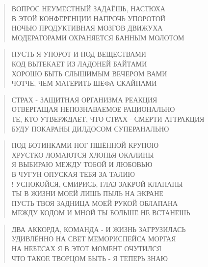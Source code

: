 \poemtitle{***}
\begin{verse}
ВОПРОС НЕУМЕСТНЫЙ ЗАДАЁШЬ, НАСТЮХА\\
В ЭТОЙ КОНФЕРЕНЦИИ НАПРОЧЬ УПОРОТОЙ\\
НОЧЬЮ ПРОДУКТИВНАЯ МОЗГОВ ДВИЖУХА\\
МОДЕРАТОРАМИ ОХРАНЯЕТСЯ БАННЫМ МОЛОТОМ
\end{verse}

\poemtitle{***}
\begin{verse}
ПУСТЬ Я УПОРОТ И ПОД ВЕЩЕСТВАМИ\\
КОД ВЫТЕКАЕТ ИЗ ЛАДОНЕЙ БАЙТАМИ\\
ХОРОШО БЫТЬ СЛЫШИМЫМ ВЕЧЕРОМ ВАМИ\\
ЧОТЧЕ, ЧЕМ МАТЕРИТЬ ШЕФА СКАЙПАМИ
\end{verse}

\poemtitle{***}
\begin{verse}
СТРАХ - ЗАЩИТНАЯ ОРГАНИЗМА РЕАКЦИЯ\\
ОТВЕРГАЩАЯ НЕПОЗНАВАЕМОЕ РАЦИОНАЛЬНО\\
ТЕ, КТО УТВЕРЖДАЕТ, ЧТО СТРАХ - СМЕРТИ АТТРАКЦИЯ\\
БУДУ ПОКАРАНЫ ДИЛДОСОМ СУПЕРАНАЛЬНО
\end{verse}

\poemtitle{***}
\begin{verse}
ПОД БОТИНКАМИ НОГ ПШЁННОЙ КРУПОЮ\\
ХРУСТКО ЛОМАЮТСЯ ХЛОПЬЯ ОКАЛИНЫ\\
Я ВЫБИРАЮ МЕЖДУ ТОБОЙ И ЛЮБОВЬЮ\\
В ЧУГУН ОПУСКАЯ ТЕБЯ ЗА ТАЛИЮ\\!
УСПОКОЙСЯ, СМИРИСЬ, ГЛАЗ ЗАКРОЙ КЛАПАНЫ\\
ТЫ В ЖИЗНИ МОЕЙ ЛИШЬ ПЫЛЬ НА ЭКРАНЕ\\
ПУСТЬ ТВОЯ ЗАДНИЦА МОЕЙ РУКОЙ ОБЛАПАНА\\
МЕЖДУ КОДОМ И МНОЙ ТЫ БОЛЬШЕ НЕ ВСТАНЕШЬ
\end{verse}

\poemtitle{***}
\begin{verse}
ДВА АККОРДА, КОМАНДА - И ЖИЗНЬ ЗАГРУЗИЛАСЬ\\
УДИВЛЁННО НА СВЕТ МЕМОРИСПЕЙСА МОРГАЯ\\
НА НЕБЕСАХ Я В ЭТОТ МОМЕНТ ОЧУТИЛСЯ\\
ЧТО ТАКОЕ ТВОРЦОМ БЫТЬ - Я ТЕПЕРЬ ЗНАЮ
\end{verse}

